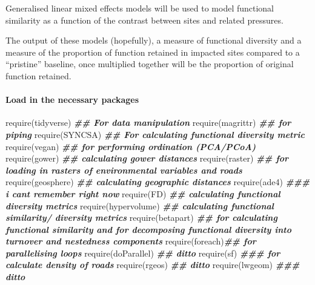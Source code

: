 \documentclass[
]{article}
\newenvironment{Shaded}{\begin{snugshade}}{\end{snugshade}}
\newcommand{\DocumentationTok}[1]{\textcolor[rgb]{0.56,0.35,0.01}{\textbf{\textit{#1}}}}
\newcommand{\FunctionTok}[1]{\textcolor[rgb]{0.00,0.00,0.00}{#1}}
\newcommand{\NormalTok}[1]{#1}
\begin{document}
Generalised linear mixed effects models will be used to model functional
similarity as a function of the contrast between sites and related
pressures.

The output of these models (hopefully), a measure of functional
diversity and a measure of the proportion of function retained in
impacted sites compared to a ``pristine'' baseline, once multiplied
together will be the proportion of original function retained.

\hypertarget{load-in-the-necessary-packages}{%
\paragraph{Load in the necessary
packages}\label{load-in-the-necessary-packages}}

\begin{Shaded}
\begin{Highlighting}[]
\FunctionTok{require}\NormalTok{(tidyverse) }\DocumentationTok{\#\# For data manipulation}
\FunctionTok{require}\NormalTok{(magrittr) }\DocumentationTok{\#\# for piping}
\FunctionTok{require}\NormalTok{(SYNCSA) }\DocumentationTok{\#\# For calculating functional diversity metric}
\FunctionTok{require}\NormalTok{(vegan) }\DocumentationTok{\#\# for performing ordination (PCA/PCoA)}
\FunctionTok{require}\NormalTok{(gower) }\DocumentationTok{\#\# calculating gower distances}
\FunctionTok{require}\NormalTok{(raster) }\DocumentationTok{\#\# for loading in rasters of environmental variables and roads}
\FunctionTok{require}\NormalTok{(geosphere) }\DocumentationTok{\#\# calculating geographic distances}
\FunctionTok{require}\NormalTok{(ade4)  }\DocumentationTok{\#\#\# i can\textquotesingle{}t remember right now}
\FunctionTok{require}\NormalTok{(FD) }\DocumentationTok{\#\# calculating functional diversity metrics}
\FunctionTok{require}\NormalTok{(hypervolume) }\DocumentationTok{\#\# calculating functional similarity/ diversity metrics }
\FunctionTok{require}\NormalTok{(betapart) }\DocumentationTok{\#\# for calculating functional similarity and for decomposing functional diversity into turnover and nestedness components }
\FunctionTok{require}\NormalTok{(foreach)}\DocumentationTok{\#\# for parallelising loops}
\FunctionTok{require}\NormalTok{(doParallel) }\DocumentationTok{\#\# ditto}
\FunctionTok{require}\NormalTok{(sf)   }\DocumentationTok{\#\#\# for calculate density of roads}
\FunctionTok{require}\NormalTok{(rgeos) }\DocumentationTok{\#\# ditto }
\FunctionTok{require}\NormalTok{(lwgeom) }\DocumentationTok{\#\#\# ditto}
\end{Highlighting}
\end{Shaded}
\end{document}
